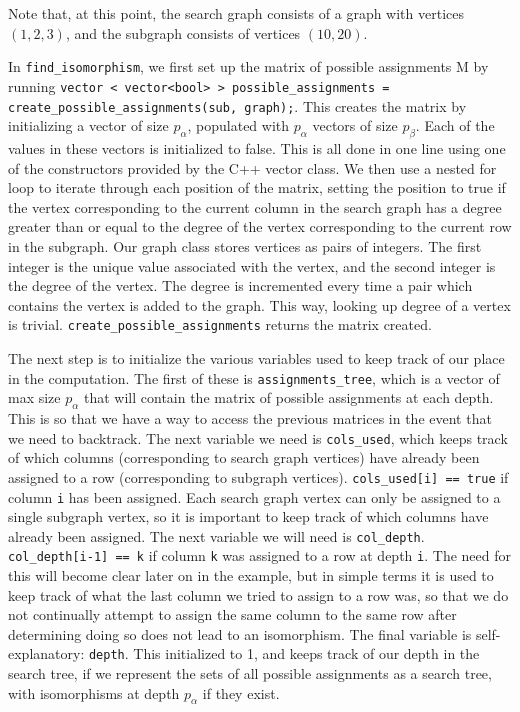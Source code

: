 \documentclass{article}
\begin{document}
  Note that, at this point, the search graph consists of a graph with vertices $(1, 2, 3)$, and the subgraph consists of vertices $(10, 20)$.

  In \texttt{find\_isomorphism}, we first set up the matrix of possible assignments M by running \texttt{vector < vector<bool> > possible\_assignments = create\_possible\_assignments(sub, graph);}. This creates the matrix by initializing a vector of size $p_{\alpha}$, populated with $p_{\alpha}$ vectors of size $p_{\beta}$. Each of the values in these vectors is initialized to false. This is all done in one line using one of the constructors provided by the C++ vector class. We then use a nested for loop to iterate through each position of the matrix, setting the position to true if the vertex corresponding to the current column in the search graph has a degree greater than or equal to the degree of the vertex corresponding to the current row in the subgraph. Our graph class stores vertices as pairs of integers. The first integer is the unique value associated with the vertex, and the second integer is the degree of the vertex. The degree is incremented every time a pair which contains the vertex is added to the graph. This way, looking up degree of a vertex is trivial. \texttt{create\_possible\_assignments} returns the matrix created.

  The next step is to initialize the various variables used to keep track of our place in the computation. The first of these is \texttt{assignments\_tree}, which is a vector of max size $p_{\alpha}$ that will contain the matrix of possible assignments at each depth. This is so that we have a way to access the previous matrices in the event that we need to backtrack. The next variable we need is \texttt{cols\_used}, which keeps track of which columns (corresponding to search graph vertices) have already been assigned to a row (corresponding to subgraph vertices). \texttt{cols\_used[i] == true} if column \texttt{i} has been assigned. Each search graph vertex can only be assigned to a single subgraph vertex, so it is important to keep track of which columns have already been assigned. The next variable we will need is \texttt{col\_depth}. \texttt{col\_depth[i-1] == k} if column \texttt{k} was assigned to a row at depth \texttt{i}. The need for this will become clear later on in the example, but in simple terms it is used to keep track of what the last column we tried to assign to a row was, so that we do not continually attempt to assign the same column to the same row after determining doing so does not lead to an isomorphism. The final variable is self-explanatory: \texttt{depth}. This initialized to 1, and keeps track of our depth in the search tree, if we represent the sets of all possible assignments as a search tree, with isomorphisms at depth $p_{\alpha}$ if they exist.
\end{document}

